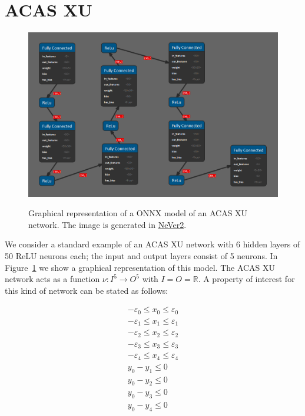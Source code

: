 \section{ACAS XU}

\begin{figure}[t]
\includegraphics[width=1\textwidth]{imgs/ACAS_CCNN.png}
\label{img:acas-architecture}
\caption{Graphical representation of a ONNX model of an ACAS XU network. 
	The image is generated in \href{https://github.com/NeVerTools/NeVer2}
	{NeVer2}.}
\end{figure}

We consider a standard example of an ACAS XU network with 6 hidden
layers of 50 ReLU neurons each; the input and output layers consist 
of 5 neurons. In Figure~\ref{img:acas-architecture} we show a graphical
representation of this model. The ACAS XU network acts as a function 
$\nu : I^5 \to O^5$ with $I = O = \mathbb{R}$.  A property of interest 
for this kind of network can be stated as follows: 

\begin{equation}
\label{eq:acas-property1}
\begin{array}{l}
- \varepsilon_0 \leq x_0 \leq \varepsilon_0 \\
- \varepsilon_1 \leq x_1 \leq \varepsilon_1 \\
- \varepsilon_2 \leq x_2 \leq \varepsilon_2 \\
- \varepsilon_3 \leq x_3 \leq \varepsilon_3 \\
- \varepsilon_4 \leq x_4 \leq \varepsilon_4 \\
y_0 - y_1 \leq 0 \\
y_0 - y_2 \leq 0 \\
y_0 - y_3 \leq 0 \\
y_0 - y_4 \leq 0 \\
\end{array}
\end{equation}

